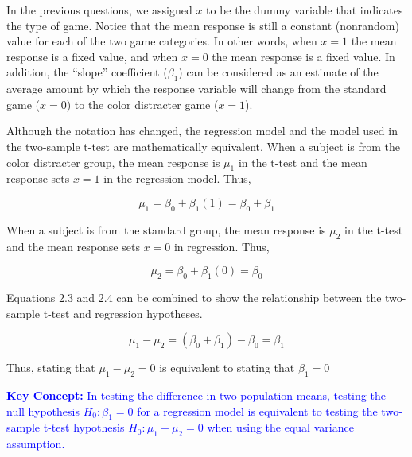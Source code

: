 \documentclass[
]{report}
\begin{document}
In the previous questions, we assigned \(\scriptstyle x\) to be the dummy variable that indicates the type of game. Notice that the mean response is still a constant (nonrandom) value for each of the two game categories. In other words, when \(\scriptstyle x = 1\) the mean response is a fixed value, and when \(\scriptstyle x = 0\) the mean response is a fixed value. In addition, the ``slope'' coefficient (\(\scriptstyle \beta_1\)) can be considered as an estimate of the average amount by which the response variable will change from the standard game (\(\scriptstyle x = 0\)) to the color distracter game (\(\scriptstyle x = 1\)).

Although the notation has changed, the regression model and the model used in the two-sample t-test are mathematically equivalent. When a subject is from the color distracter group, the mean response is \(\scriptstyle \mu_1\) in the t-test and the mean response sets \(\scriptstyle x = 1\) in the regression model. Thus,

\begin{equation}
\label{2.3} 
\mu_1 = \beta_0 + \beta_1(1)  = \beta_0 + \beta_1 
\tag{2.3}
\end{equation}

When a subject is from the standard group, the mean response is \(\scriptstyle \mu_2\) in the t-test and the mean response sets \(\scriptstyle x = 0\) in regression. Thus,

\begin{equation}
\label{2.4} 
\mu_2 = \beta_0 + \beta_1(0)  = \beta_0 
\tag{2.4}
\end{equation}

Equations 2.3 and 2.4 can be combined to show the relationship between the two-sample t-test and regression hypotheses.

\begin{equation}
\label{2.5} 
\mu_1 - \mu_2 = (\beta_0 + \beta_1) -  \beta_0 = \beta_1 
\tag{2.5}
\end{equation}

Thus, stating that \(\scriptstyle \mu_1 - \mu_2 = 0\) is equivalent to stating that \(\scriptstyle \beta_1 = 0\)

\textbf{\textcolor{blue}{Key Concept:}}
\textcolor{blue}{In testing the difference in two population means, testing the null hypothesis $\scriptstyle H_0 : \beta_1 = 0$ for a regression model is equivalent to testing the two-sample t-test hypothesis $\scriptstyle H_0 : \mu_1 - \mu_2 = 0$ when using the equal variance assumption.}
\end{document}
